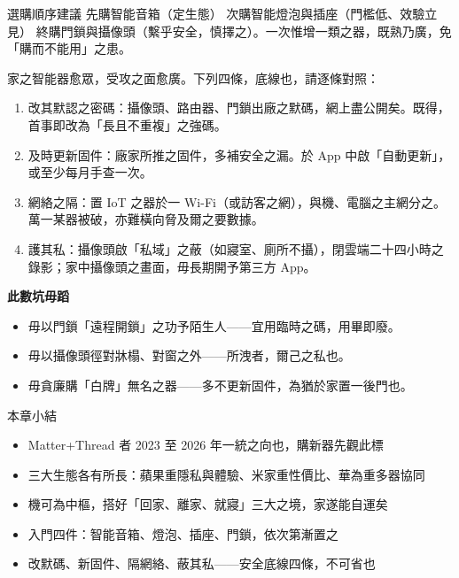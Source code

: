 \begin{tcbinfo}{選購順序建議}
先購智能音箱（定生態） 次購智能燈泡與插座（門檻低、效驗立見） 終購門鎖與攝像頭（繫乎安全，慎擇之）。一次惟增一類之器，既熟乃廣，免「購而不能用」之患。

\end{tcbinfo}


家之智能器愈眾，受攻之面愈廣。下列四條，底線也，請逐條對照：

\begin{enumerate}
  \item 改其默認之密碼：攝像頭、路由器、門鎖出廠之默碼，網上盡公開矣。既得，首事即改為「長且不重複」之強碼。
  \item 及時更新固件：廠家所推之固件，多補安全之漏。於 App 中啟「自動更新」，或至少每月手查一次。
  \item 網絡之隔：置 IoT 之器於一 Wi-Fi（或訪客之網），與機、電腦之主網分之。萬一某器被破，亦難橫向脅及爾之要數據。
  \item 護其私：攝像頭啟「私域」之蔽（如寢室、廁所不攝），閉雲端二十四小時之錄影；家中攝像頭之畫面，毋長期開予第三方 App。
\end{enumerate}

\textbf{此數坑毋蹈}\par

\begin{itemize}
  \item 毋以門鎖「遠程開鎖」之功予陌生人——宜用臨時之碼，用畢即廢。
  \item 毋以攝像頭徑對牀榻、對窗之外——所洩者，爾己之私也。
  \item 毋貪廉購「白牌」無名之器——多不更新固件，為猶於家置一後門也。
\end{itemize}

\begin{tcbsummary}{本章小結}
\begin{itemize}
  \item Matter+Thread 者 2023 至 2026 年一統之向也，購新器先觀此標
  \item 三大生態各有所長：蘋果重隱私與體驗、米家重性價比、華為重多器協同
  \item 機可為中樞，搭好「回家、離家、就寢」三大之境，家遂能自運矣
  \item 入門四件：智能音箱、燈泡、插座、門鎖，依次第漸置之
  \item 改默碼、新固件、隔網絡、蔽其私——安全底線四條，不可省也
\end{itemize}

\end{tcbsummary}
